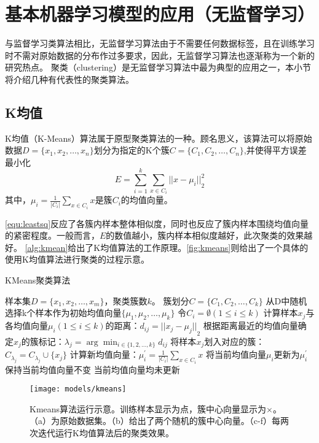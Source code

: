 \section{基本机器学习模型的应用（无监督学习）}
与监督学习类算法相比，无监督学习算法由于不需要任何数据标签，且在训练学习时不需对原始数据的分布作过多要求，因此，无监督学习算法也逐渐称为一个新的研究热点。
聚类（clustering）是无监督学习算法中最为典型的应用之一，本小节将介绍几种有代表性的聚类算法。

\subsection{K均值}
K均值（K-Means）算法属于原型聚类算法的一种\cite{Zhou2016,Liu2018}。顾名思义，该算法可以将原始数据$D=\{x_1,x_2,\dots,x_n\}$划分为指定的K个簇$C=\{C_1,C_2,\dots,C_n\}$,并使得平方误差最小化
\begin{equation}
    \label{equ:leastsq}
    E=\sum_{i=1}^k \sum_{x \in C_i}{||x- \mu_i||}_2^2
\end{equation}
其中，$\mu_i = \frac{1}{|C_i|} \sum_{x \in C_i}{x}$是簇$C_i$的均值向量。

\autoref{equ:leastsq}反应了各簇内样本整体相似度，同时也反应了簇内样本围绕均值向量的紧密程度。一般而言，$E$的数值越小，簇内样本相似度越好，此次聚类的效果越好。
\autoref{alg:kmean}给出了K均值算法的工作原理。\autoref{fig:kmeans}则给出了一个具体的使用K均值算法进行聚类的过程示意。
\begin{breakablealgorithm}
    \caption[KMeans聚类算法]{KMeans聚类算法\cite{Zhou2016}}
    \label{alg:kmean}
    \begin{algorithmic}[1] %
        \Require 样本集$D=\{x_1,x_2,\dots,x_m\}$，聚类簇数$k$。
        \Ensure 簇划分$C=\{C_1,C_2,\dots,C_k\}$
        \State 从D中随机选择k个样本作为初始均值向量$\{\mu_1,\mu_2,\dots,\mu_k\}$
        \Repeat
        \State 令$C_i=\emptyset (1\le i\le k)$
                \State 计算样本$x_j$与各均值向量$\mu_i (1\le i \le k)$的距离：$d_{ij}={||x_j - \mu_j||}_2$
                \State 根据距离最近的均值向量确定$x_j$的簇标记：$\lambda_j = \arg \min_{i \in \{1,2,\dots,k\}} d_{ij}$
                \State 将样本$x_j$划入对应的簇：$C_{\lambda_j} = C_{\lambda_j} \cup \{x_j\}$
            \EndFor
                \State 计算新均值向量：$\mu_i^{'}=\frac{1}{|C_i|} \sum_{x \in C_i}{x}$
                    \State 将当前均值向量$\mu_i$更新为$\mu_i^{'}$
                \Else
                    \State 保持当前均值向量不变
                \EndIf
            \EndFor
        \Until 当前均值向量均未更新
    \end{algorithmic}
\end{breakablealgorithm}
\begin{figure}[htbp]
    \centering
    \texttt{[image: models/kmeans]}
    \caption[Kmeans算法运行示意]{\label{fig:kmeans}Kmeans算法运行示意\cite{kmeans}。训练样本显示为点，簇中心向量显示为$\times$。（a）为原始数据集。（b）给出了两个随机的簇中心向量。（c-f）每两次迭代运行K均值算法后的聚类效果。}
\end{figure}

